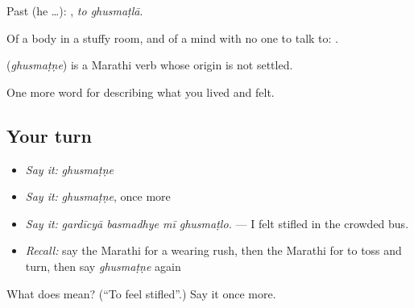 Past (he …):  , \emph{to ghusmaṭlā}.

Of a body in a stuffy room, and of a mind with no one to talk to:    .

\begin{cousinweb}
\textbf{} (\emph{ghusmaṭṇe}) is a Marathi verb whose origin is not settled.
\end{cousinweb}

\begin{grammarlens}[title={What you've built}]
One more word for describing what you lived and felt.
\end{grammarlens}

\subsection*{Your turn}
\begin{itemize}
\raggedright
  \item \emph{Say it:} \emph{ghusmaṭṇe}
  \item \emph{Say it:} \emph{ghusmaṭṇe}, once more
  \item \emph{Say it:} \emph{gardīcyā basmadhye mī ghusmaṭlo.} — I felt stifled in the crowded bus.
  \item \emph{Recall:} say the Marathi for a wearing rush, then the Marathi for to toss and turn, then say \emph{ghusmaṭṇe} again
\end{itemize}

\begin{tcolorbox}[breakable,colback=teal!4,colframe=teal!35!black,title={Before you move on}]
What does  mean? (\textquotedblleft{}To feel stifled\textquotedblright{}.) Say it once more.
\end{tcolorbox}
